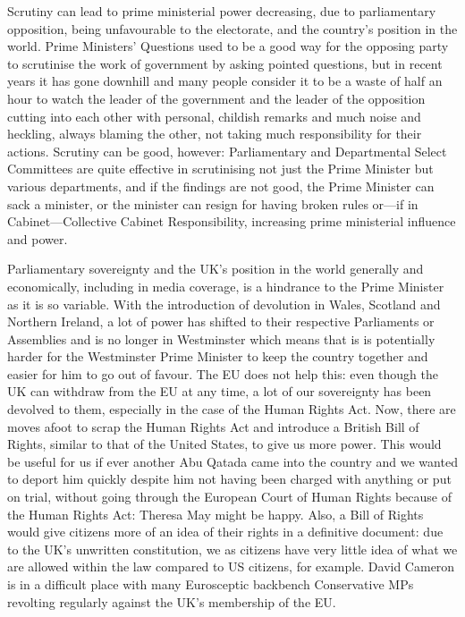 \documentclass[a4paper]{article}
\begin{document}
Scrutiny can lead to prime ministerial power decreasing, due to parliamentary opposition, being unfavourable to the electorate, and the country's position in the world.  Prime Ministers' Questions used to be a good way for the opposing party to scrutinise the work of government by asking pointed questions, but in recent years it has gone downhill and many people consider it to be a waste of half an hour to watch the leader of the government and the leader of the opposition cutting into each other with personal, childish remarks and much noise and heckling, always blaming the other, not taking much responsibility for their actions.  Scrutiny can be good, however: Parliamentary and Departmental Select Committees are quite effective in scrutinising not just the Prime Minister but various departments, and if the findings are not good, the Prime Minister can sack a minister, or the minister can resign for having broken rules or---if in Cabinet---Collective Cabinet Responsibility, increasing prime ministerial influence and power.

Parliamentary sovereignty and the UK's position in the world generally and economically, including in media coverage, is a hindrance to the Prime Minister as it is so variable.  With the introduction of devolution in Wales, Scotland and Northern Ireland, a lot of power has shifted to their respective Parliaments or Assemblies and is no longer in Westminster which means that is is potentially harder for the Westminster Prime Minister to keep the country together and easier for him to go out of favour.  The EU does not help this: even though the UK can withdraw from the EU at any time, a lot of our sovereignty has been devolved to them, especially in the case of the Human Rights Act.  Now, there are moves afoot to scrap the Human Rights Act and introduce a British Bill of Rights, similar to that of the United States, to give us more power.  This would be useful for us if ever another Abu Qatada came into the country and we wanted to deport him quickly despite him not having been charged with anything or put on trial, without going through the European Court of Human Rights because of the Human Rights Act: Theresa May might be happy.  Also, a Bill of Rights would give citizens more of an idea of their rights in a definitive document: due to the UK's unwritten constitution, we as citizens have very little idea of what we are allowed within the law compared to US citizens, for example.  David Cameron is in a difficult place with many Eurosceptic backbench Conservative MPs revolting regularly against the UK's membership of the EU.
\end{document}
